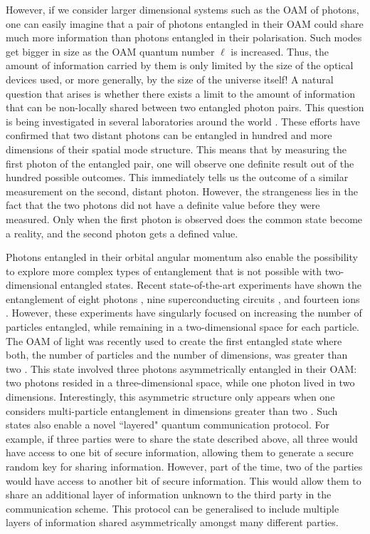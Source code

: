 \documentclass{article}
\begin{document}
However, if we consider larger dimensional systems such as the OAM of photons, one can easily imagine that a pair of photons entangled in their OAM could share much more information than photons entangled in their polarisation. Such modes get bigger in size as the OAM quantum number $\ell$ is increased. Thus, the amount of information carried by them is only limited by the size of the optical devices used, or more generally, by the size of the universe itself! A natural question that arises is whether there exists a limit to the amount of information that can be non-locally shared between two entangled photon pairs. This question is being investigated in several laboratories around the world \cite{vaziri2002experimental,torres2003preparation,molina2004triggered,pors2008shannon,agnew2011tomography,Dada:2011vc,romero2012increasing,mclaren2012entangled,salakhutdinov2012full,giovannini2013characterization,Krenn:2014jy,bolduc2015direct}. These efforts have confirmed that two distant photons can be entangled in hundred and more dimensions of their spatial mode structure. This means that by measuring the first photon of the entangled pair, one will observe one definite result out of the hundred possible outcomes. This immediately tells us the outcome of a similar measurement on the second, distant photon. However, the strangeness lies in the fact that the two photons did not have a definite value before they were measured. Only when the first photon is observed does the common state become a reality, and the second photon gets a defined value. 

Photons entangled in their orbital angular momentum also enable the possibility to explore more complex types of entanglement that is not possible with two-dimensional entangled states. Recent state-of-the-art experiments have shown the entanglement of eight photons \cite{Yao:2012fp}, nine superconducting circuits \cite{Kelly:2015gi}, and fourteen ions \cite{Lanyon:2014eh}. However, these experiments have singularly focused on increasing the number of particles entangled, while remaining in a two-dimensional space for each particle. The OAM of light was recently used to create the first entangled state where both, the number of particles and the number of dimensions, was greater than two \cite{malik2015multi}. This state involved three photons asymmetrically entangled in their OAM: two photons resided in a three-dimensional space, while one photon lived in two dimensions. Interestingly, this asymmetric structure only appears when one considers multi-particle entanglement in dimensions greater than two \cite{Huber:2013ie}. Such states also enable a novel ``layered" quantum communication protocol. For example, if three parties were to share the state described above, all three would have access to one bit of secure information, allowing them to generate a secure random key for sharing information. However, part of the time, two of the parties would have access to another bit of secure information. This would allow them to share an additional layer of information unknown to the third party in the communication scheme. This protocol can be generalised to include multiple layers of information shared asymmetrically amongst many different parties.
\end{document}
